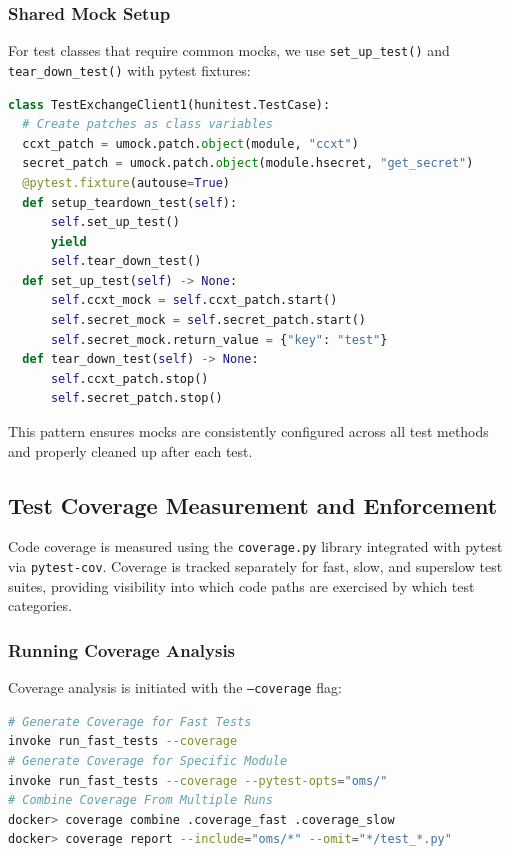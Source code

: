 \subsubsection{Shared Mock Setup}
For test classes that require common mocks, we use \texttt{set\_up\_test()}
and \texttt{tear\_down\_test()} with pytest fixtures:

\begin{lstlisting}[language=Python]
class TestExchangeClient1(hunitest.TestCase):
  # Create patches as class variables
  ccxt_patch = umock.patch.object(module, "ccxt")
  secret_patch = umock.patch.object(module.hsecret, "get_secret")
  @pytest.fixture(autouse=True)
  def setup_teardown_test(self):
      self.set_up_test()
      yield
      self.tear_down_test()
  def set_up_test(self) -> None:
      self.ccxt_mock = self.ccxt_patch.start()
      self.secret_mock = self.secret_patch.start()
      self.secret_mock.return_value = {"key": "test"}
  def tear_down_test(self) -> None:
      self.ccxt_patch.stop()
      self.secret_patch.stop()
\end{lstlisting}

This pattern ensures mocks are consistently configured across all test
methods and properly cleaned up after each test.

\subsection{Test Coverage Measurement and Enforcement}
Code coverage is measured using the \texttt{coverage.py} library
integrated with pytest via \texttt{pytest-cov}. Coverage is tracked
separately for fast, slow, and superslow test suites, providing visibility
into which code paths are exercised by which test categories.

\subsubsection{Running Coverage Analysis}
Coverage analysis is initiated with the \texttt{--coverage} flag:

\begin{lstlisting}[language=bash]
# Generate Coverage for Fast Tests
invoke run_fast_tests --coverage
# Generate Coverage for Specific Module
invoke run_fast_tests --coverage --pytest-opts="oms/"
# Combine Coverage From Multiple Runs
docker> coverage combine .coverage_fast .coverage_slow
docker> coverage report --include="oms/*" --omit="*/test_*.py"
\end{lstlisting}

